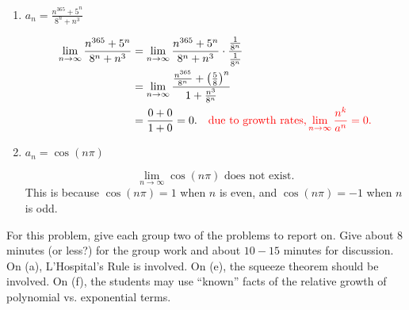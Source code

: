 \documentclass[]{ximera}
\begin{document}
\begin{problem}
\begin{enumerate}
	
	
	\item  $a_n = \frac{n^{365} + 5^n}{8^n + n^3}$
	\begin{freeResponse}
		\begin{align*}
		\lim_{n \to \infty} \frac{n^{365} + 5^n}{8^n + n^3}
		&= \lim_{n \to \infty} \frac{n^{365} + 5^n}{8^n + n^3} \cdot \frac{\frac{1}{8^n}}{\frac{1}{8^n}}  \\
		&=  \lim_{n \to \infty} \frac{\frac{n^{365}}{8^n} + \left( \frac{5}{8} \right)^n}{1 + \frac{n^3}{8^n}}  \\
		&= \frac{0+0}{1+0} = 0.		\quad	{\color{red}\text{due to growth rates,} \lim_{n \to \infty} \frac{n^k}{a^n} = 0.}
		\end{align*}
	\end{freeResponse}
	
	
	
	\item  $a_n = \cos(n \pi)$
	\begin{freeResponse}
	\[
	\lim_{n \to \infty} \cos(n \pi) \text{ does not exist}.
	\]
	This is because $\cos(n \pi) = 1$ when $n$ is even, and $\cos(n \pi) = -1$ when $n$ is odd.
	\end{freeResponse}
	
	\end{enumerate}
	
\end{problem}

\begin{instructorNotes}
For this problem, give each group two of the problems to report on.  
Give about $8$ minutes (or less?) for the group work and about $10-15$ minutes for discussion.  
On (a), L'Hospital's Rule is involved.  
On (e), the squeeze theorem should be involved.  
On (f), the students may use ``known'' facts of the relative growth of polynomial vs. exponential terms.
\end{instructorNotes}
\end{document}

